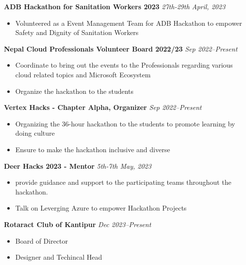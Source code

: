 {\textbf{ADB Hackathon for Sanitation Workers 2023} \hfill \textit{27th-29th April, 2023}}\par
\begin{itemize}
	\item Volunteered as a Event Management Team for ADB Hackathon to empower Safety and Dignity of Sanitation Workers    
\end{itemize}\par

{\textbf{Nepal Cloud Professionals Volunteer Board 2022/23} \hfill \textit{Sep 2022--Present}}\par
\begin{itemize}
	\item Coordinate to bring out the events to the Professionals regarding various cloud related topics and Microsoft Ecosystem

 	\item Organize the hackathon to the students
    
\end{itemize}\par

{\textbf{Vertex Hacks - Chapter Alpha, Organizer} \hfill \textit{Sep 2022--Present}}\par
\begin{itemize}
	\item Organizing the 36-hour hackathon to the students to promote learning by doing culture
        \item Ensure to make the hackathon inclusive and diverse
\end{itemize}\par

{\textbf{Deer Hacks 2023 - Mentor} \hfill \textit{5th-7th May, 2023}}\par
\begin{itemize}
	\item provide guidance and support to the participating teams throughout the hackathon.
        \item Talk on Leverging Azure to empower Hackathon Projects
\end{itemize}\par

{\textbf{Rotaract Club of Kantipur} \hfill \textit{Dec 2023--Present}}\par
\begin{itemize}
 \item Board of Director
 \item Designer and Techincal Head
\end{itemize}\par

